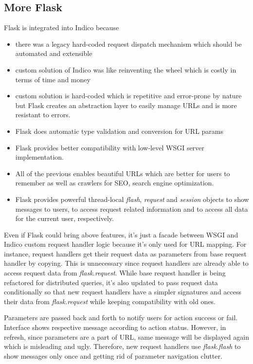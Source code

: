 \subsection{More Flask}

Flask is integrated into Indico because
\begin{itemize}
  \item there was a legacy hard-coded request dispatch mechanism which should be automated and extensible
  \item custom solution of Indico was like reinventing the wheel which is costly in terms of time and money
  \item custom solution is hard-coded which is repetitive and error-prone by nature but Flask creates an abstraction layer to easily manage URLs and is more resistant to errors.
  \item Flask does automatic type validation and conversion for URL params
  \item Flask provides better compatibility with low-level WSGI server implementation.
  \item All of the previous enables beautiful URLs which are better for users to remember as well as crawlers for SEO, search engine optimization.
  \item Flask provides powerful thread-local \textit{flash}, \textit{request} and \textit{session} objects to show messages to users, to access request related information and to access all data for the current user, respectively. 
\end{itemize}

Even if Flask could bring above features, it's just a facade between WSGI and Indico custom request handler logic because it's only used for URL mapping. For instance, request handlers get their request data as parameters from base request handler by copying. This is unnecessary since request handlers are already able to access request data from \textit{flask.request}. While base request handler is being refactored for distributed queries, it's also updated to pass request data conditionally so that new request handlers have a simpler signatures and access their data from \textit{flask.request} while keeping compatibility with old ones.

Parameters are passed back and forth to notify users for action success or fail. Interface shows respective message according to action status. However, in refresh, since parameters are a part of URL, same message will be displayed again which is misleading and ugly. Therefore, new request handlers use \textit{flask.flash} to show messages only once and getting rid of parameter navigation clutter.

